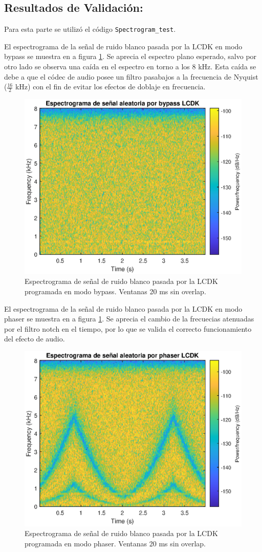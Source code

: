\subsection{Resultados de Validación:}
Para esta parte se utilizó el código \texttt{Spectrogram\_test}.

El espectrograma de la señal de ruido blanco pasada por la LCDK en modo bypass se muestra en a figura \ref{fig:bypass}. Se aprecia el espectro plano esperado, salvo por otro lado se observa una caída en el espectro en torno a los 8 kHz. Esta caída se debe a que el códec de audio posee un filtro pasabajos a la frecuencia de Nyquist ($\tfrac{16}{2}$ kHz) con el fin de evitar los efectos de doblaje en frecuencia.  
\begin{figure}[H]
    \centering
    \includegraphics[width = .8\linewidth]{figures/bypass_spectrogram.eps}
    \caption{Espectrograma de señal de ruido blanco pasada por la LCDK programada en modo bypass. Ventanas 20 ms sin overlap.}
    \label{fig:bypass}
\end{figure}

El espectrograma de la señal de ruido blanco pasada por la LCDK en modo phaser se muestra en a figura \ref{fig:bypass}. Se aprecia el cambio de la frecuecias atenuadas por el filtro notch en el tiempo, por lo que se valida el correcto funcionamiento del efecto de audio.

\begin{figure}[H]
    \centering
    \includegraphics[width = .8\linewidth]{figures/phaser_spectrogram.eps}
    \caption{Espectrograma de señal de ruido blanco pasada por la LCDK programada en modo phaser. Ventanas 20 ms sin overlap.}
    \label{fig:phaser}
\end{figure}



